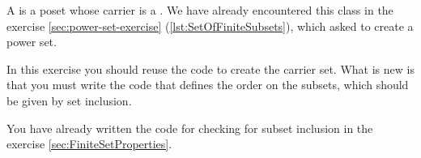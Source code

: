 


A  is a poset whose carrier is a .
We have already encountered this class in the exercise \cref{sec:power-set-exercise} (\cref{lst:SetOfFiniteSubsets}), which asked to create a power set.

In this exercise you should reuse the code to create the carrier set.
What is new is that you must write the code that defines the order on the subsets, which should be given by set inclusion.

You have already written the code for checking for subset inclusion in the exercise \cref{sec:FiniteSetProperties}.


